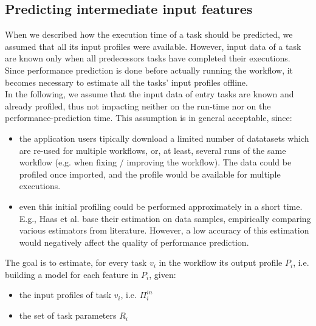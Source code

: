 \documentclass[a4paper, 10pt, conference]{ieeeconf}      %
\begin{document}
\color{black}
\subsection{Predicting intermediate input features}

\label{section:intermediate_input}
When we described how the execution time of a task should be predicted, we assumed that all its input profiles were available. However, input data of a task are known only when all predecessors tasks have completed their executions.\\
Since performance prediction is done before actually running the workflow, it becomes necessary to estimate all the tasks' input profiles  offline.\\
In the following, we assume that the input data of entry tasks are known and already profiled, thus not impacting neither on the run-time nor on the performance-prediction time. This assumption is in general acceptable, since:
\begin{itemize}
    \item the application users tipically download a limited number of datatasets which are re-used for multiple workflows, or, at least, several runs of the same workflow (e.g. when fixing / improving the workflow). The data could be profiled once imported, and the profile would be available for multiple executions.
    \item  even this initial profiling could be performed approximately in a short time. E.g., Haas et al.\cite{haas1995sampling} base their estimation on data samples, empirically comparing various estimators from literature. 
    However, a low accuracy of this estimation would negatively affect the quality of performance prediction.
\end{itemize}

 The goal is to estimate, for every task $v_i$ in the workflow its output profile $P_i$, i.e. building a model for each feature in $P_i$, given:
\begin{itemize}
    \item the input profiles of task $v_i$, i.e. $\Pi^{in}_i$
    \item the set of task parameters $R_i$
\end{itemize}{}
\end{document}
